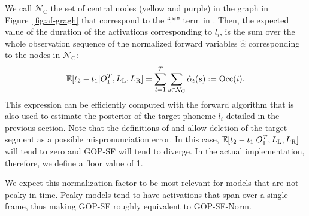 We call $\mathcal{N}_{\text{C}}$ the set of central nodes (yellow and purple) in the graph in Figure~\ref{fig:af-gragh} that correspond to the ``.*'' term in \Lsdi.
Then, the expected value of the duration of the activations corresponding to $l_i$, is the sum over the whole observation sequence of the normalized forward variables $\hat{\alpha}$ corresponding to the nodes in $\mathcal{N}_{\text{C}}$:
\begin{equation}
    \mathbb{E}[t_2-t_1|O_1^T, L_{\text{L}}, L_{\text{R}}] = \sum_{t=1}^{T}\sum_{s\in \mathcal{N}_{\text{C}}} \hat{\alpha}_t(s) := \text{Occ}(i).
    \label{eq:estimate_occupation}
\end{equation}    
This expression can be efficiently computed with the forward algorithm that is also used to estimate the posterior of the target phoneme $l_i$ detailed in the previous section.
Note that the definitions of \Lsdi and \Lsd allow deletion of the target segment as a possible mispronunciation error.
In this case, $\mathbb{E}[t_2-t_1|O_1^T, L_{\text{L}}, L_{\text{R}}]$ will tend to zero and GOP-SF will tend to diverge.
In the actual implementation, therefore, we define a floor value of 1.

We expect this normalization factor to be most relevant for models that are not peaky in time.
Peaky models tend to have activations that span over a single frame, thus making GOP-SF roughly equivalent to GOP-SF-Norm.

